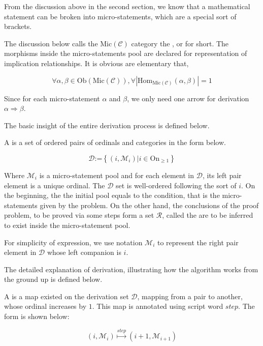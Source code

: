 \documentclass{article}
\begin{document}
From the discussion above in the second section, we know that a mathematical statement can be broken into micro-statements, which are a special sort of brackets.

The discussion below calls the \(\text{Mic}(\mathcal{C})\) category the , or  for short. The morphisms inside the micro-statements pool are declared for representation of implication relationships. It is obvious are elementary that,

\[\forall \alpha ,\beta \in \text{Ob}(\text{Mic}(\mathcal{C})), \forall \left|\text{Hom}_{\text{Mic}(\mathcal{C})}(\alpha ,\beta )\right|=1\]

Since for each micro-statement \(\alpha\) and \(\beta\), we only need one arrow for derivation \(\alpha \Rightarrow \beta\).

The basic insight of the entire derivation process is defined below.

 A  is a set of ordered pairs of ordinals and categories in the form below. 

\[\mathcal{D}\text{:=}\left\{\left(i,\mathcal{M}_i\right)|i\in \text{On}_{\geq 1}\right\}\]

Where \(\mathcal{M}_i\) { }is a micro-statement pool and for each element in \(\mathcal{D}\), its left pair element is a unique ordinal. The $\mathcal{D}$ set is well-ordered following the sort of \(i\). On the beginning, the the initial pool equals to the condition, that is the micro-statements given by the problem. On the other hand, the conclusions of the proof problem, to be proved via some steps form a set \(\mathcal{R}\), called the  are to be inferred to exist inside the micro-statement pool.

For simplicity of expression, we use notation \(\mathcal{M}_i\) to represent the right pair element in $\mathcal{D}$ { }whose left companion is \(i\).

The detailed explanation of derivation, illustrating how the algorithm works from the ground up is defined below.

 A  is a map existed on the derivation set \(\mathcal{D}\), mapping from a pair to another, whose ordinal increases by \(1\). This map is annotated using script word \(\mathit{s}\mathit{t}\mathit{e}\mathit{p}\). The form is shown below:

\[\left(i,\mathcal{M}_i\right)\overset{\mathit{s}\mathit{t}\mathit{e}\mathit{p}}{\mapsto }\left(i+1,\mathcal{M}_{i+1}\right)\]
\end{document}
